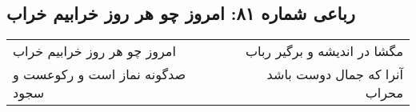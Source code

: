 \begin{center}
\section*{رباعی شماره ۸۱: امروز چو هر روز خرابیم خراب}
\label{sec:0081}
\begin{longtable}{l p{0.5cm} r}
امروز چو هر روز خرابیم خراب
&&
مگشا در اندیشه و برگیر رباب
\\
صدگونه نماز است و رکوعست و سجود
&&
آنرا که جمال دوست باشد محراب
\\
\end{longtable}
\end{center}
